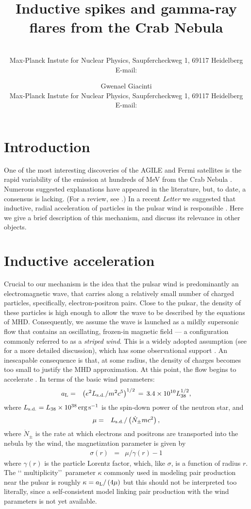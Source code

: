 \documentclass{PoS}
\title{Inductive spikes and gamma-ray flares from the Crab Nebula}
\author{\speaker{John G. Kirk}\\
        Max-Planck Instute for Nuclear Physics, Saupfercheckweg 1, 
69117 Heidelberg\\
        E-mail: \email{john.kirk@mpi-hd.mpg.de}}
\author{Gwenael Giacinti\\
Max-Planck Instute for Nuclear Physics, Saupfercheckweg 1, 
69117 Heidelberg\\
        E-mail: \email{gwenael.giacinti@mpi-hd.mpg.de}}
\begin{document}
\section{Introduction}
One of the most interesting discoveries of the AGILE and Fermi
satellites is the rapid variability of the emission at hundreds of
MeV from the Crab Nebula \cite{Agileflares11,Fermiflares11,buehleretal12}. 
Numerous suggested explanations have
appeared in the literature, but, to date, a consensus is lacking. (For
a review, see \cite{buehlerblandford14}.)  In a recent {\em Letter} we
suggested that inductive, radial acceleration of particles
in the pulsar wind is responsible \cite{kirkgiacinti17}. Here we give
a brief description of this mechanism, and discuss its relevance in
other objects.

\section{Inductive acceleration}
Crucial to our mechanism is the idea that the pulsar wind is
predominantly an electromagnetic wave, that carries along a relatively
small number of charged particles, specifically, electron-positron
pairs. Close to the pulsar, the density of these particles is high
enough to allow the wave to be described by the equations of MHD.
Consequently, we assume the wave is launched as a mildly supersonic
flow that contains an oscillating, frozen-in magnetic field --- a
configuration commonly referred to as a {\em striped wind}. 
This is a widely
adopted assumption (see \cite{porthetal17} for a more detailed
discussion), 
which has some observational support \cite{mclaughlinetal04}. 
An inescapable consequence is that, at some radius, the density of 
charges becomes too small to justify the MHD approximation. 
At this point, the flow begins to accelerate 
\cite{lyubarskykirk01,kirkskjaeraasen03,spruitdrenkhahn04,kirkmochol11,zrake16}. 
In terms of the basic wind parameters:
\begin{eqnarray}
a_{\rm L}&=&\left(e^2 L_{\rm s.d.}/m^2c^5\right)^{1/2}
\,=\,3.4\times10^{10}L_{38}^{1/2},
\end{eqnarray}
where $L_{\rm s.d.}=L_{38}\times 10^{38}\,\textrm{erg\,s}^{-1}$
is the spin-down power of the neutron star, and
\begin{eqnarray}
\mu&=&L_{\rm s.d.}/\left(\dot{N}_\pm mc^2\right),
\label{mudef}
\end{eqnarray}
where $\dot{N}_\pm$ is the rate at which electrons and positrons are
transported into the nebula by the wind, the magnetization parameter
is given by 
\begin{eqnarray}
\sigma(r)&=&\mu/\gamma(r) -1
\end{eqnarray}
where $\gamma(r)$ is the particle Lorentz factor,
which, like $\sigma$, is a function of radius $r$.  The \lq\lq
multiplicity\rq\rq\ parameter $\kappa$ commonly used in modeling pair
production near the pulsar \cite{ceruttibeloborodov17} is roughly
$\kappa=a_{\rm L}/\left(4\mu\right)$ but this should not be
interpreted too literally, since a self-consistent model linking pair
production with the wind parameters is not yet available.
\end{document}
